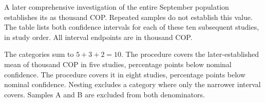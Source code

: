 \begin{probleminfoexcerpt}
A later comprehensive investigation of the entire September population establishes its  as  thousand COP. Repeated samples do not establish this value. The table lists both confidence intervals for each of these ten subsequent studies, in study order. All interval endpoints are in thousand COP.
\end{probleminfoexcerpt}



The categories sum to $5+3+2=10$. The  procedure covers the later-established mean of  thousand COP in five studies,  percentage points below nominal confidence. The  procedure covers it in eight studies,  percentage points below nominal confidence. Nesting excludes a category where only the narrower interval covers. Samples A and B are excluded from both denominators.

